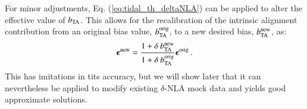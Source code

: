 For minor adjustments, Eq. (\ref{eq:tidal_th_deltaNLA}) can be applied to alter the effective value of $b_{\rm TA}$. This allows for the recalibration of the intrinsic alignment contribution from an original bias value, $b_{\rm TA}^{\rm orig}$, to a new desired bias, $b_{\rm TA}^{\rm new}$, as:
\begin{eqnarray}
{\boldsymbol \epsilon}^{\rm new} = \frac{1 + \delta \: b_{\rm TA}^{\rm new}}{1 + \delta \: b_{\rm TA}^{\rm orig}}{\boldsymbol \epsilon}^{\rm orig} \, .
\label{eq:bta_rescale}
\end{eqnarray}
This has imitations in tits accuracy, but we will show later that it can nevertheless be applied to modify existing $\delta$-NLA mock data and yields good approximate solutions.  


